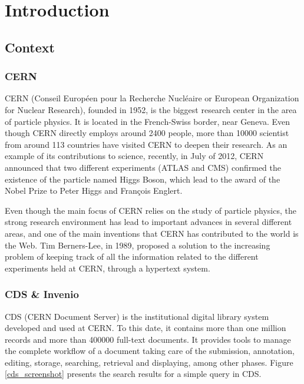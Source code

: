 \chapter{Introduction}


\section{Context}

\subsection{CERN}
CERN (Conseil Europ\'{e}en pour la Recherche Nucl\'{e}aire or European Organization for Nuclear Research)\cite{CERN}, founded in 1952, is the biggest research center in the area of particle physics. It is located in the French-Swiss border, near Geneva. Even though CERN directly employs around 2400 people, more than 10000 scientist from around 113 countries have visited CERN to deepen their research. As an example of its contributions to science, recently, in July of 2012, CERN announced that two different experiments (ATLAS and CMS) confirmed the existence of the particle named Higgs Boson, which lead to the award of the Nobel Prize to Peter Higgs and Fran\c{c}ois Englert.

Even though the main focus of CERN relies on the study of particle physics, the strong research environment has lead to important advances in several different areas, and one of the main inventions that CERN has contributed to the world is the Web. Tim Berners-Lee, in 1989, proposed a solution\cite{web_proposal} to the increasing problem of keeping track of all the information related to the different experiments held at CERN, through a hypertext system. 

\subsection{CDS & Invenio}
CDS\cite{CDS1} (CERN Document Server) is the institutional digital library system developed and used at CERN\cite{CDS2}. To this date, it contains more than one million records and more than 400000 full-text documents. It provides tools to manage the complete workflow of a document taking care of the submission, annotation, editing, storage, searching, retrieval and displaying, among other phases. Figure \ref{cds_screenshot} presents the search results for a simple query in CDS.

